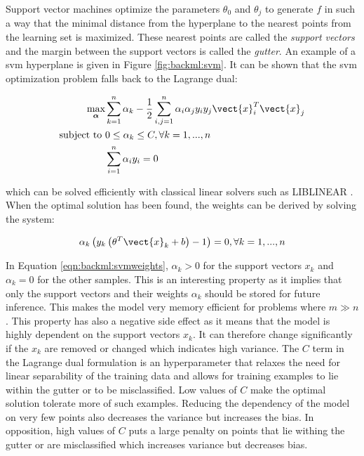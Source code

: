 Support vector machines optimize the parameters $\theta_0$ and $\theta_j$ to generate $f$ in such a way that the minimal distance from the hyperplane to the nearest points from the learning set is maximized. These nearest points are called the \textit{support vectors} and the margin between the support vectors is called the \textit{gutter}. An example of a \acrshort{svm} hyperplane is given in Figure \ref{fig:backml:svm}. It can be shown that the \acrshort{svm} optimization problem falls back to the Lagrange dual:
 
\begin{align}
\label{eqn:backml:svmoptimizationproblem}
\underset{\boldsymbol{\alpha}}{\text{max}}& \sum_{k=1}^n \alpha_k - \frac{1}{2} \sum_{i,j=1}^n \alpha_i\alpha_j y_i y_j \vect{x}_i^T \vect{x}_j \\
\text{subject to}~& 0 \leq \alpha_k \leq C, \forall k = 1, ..., n \\
& \sum_{i=1}^n \alpha_i y_i = 0
\end{align}

which can be solved efficiently with classical linear solvers such as LIBLINEAR \parencite{fan2008liblinear}. When the optimal solution has been found, the weights can be derived by solving the system: 

\begin{equation}
\label{eqn:backml:svmweights}
\alpha_k\left(y_k \left(\theta^T \vect{x}_k + b\right) - 1\right) = 0, \forall k = 1, ..., n
\end{equation}

In Equation \ref{eqn:backml:svmweights}, $\alpha_k > 0$ for the support vectors $x_k$ and $\alpha_k = 0$ for the other samples. This is an interesting property as it implies that only the support vectors and their weights $\alpha_k$ should be stored for future inference. This makes the model very memory efficient for problems where $m \gg n$. This property has also a negative side effect as it means that the model is highly dependent on the support vectors $x_k$. It can therefore change significantly if the $x_k$ are removed or changed which indicates high variance. The $C$ term in the Lagrange dual formulation is an hyperparameter that relaxes the need for linear separability of the training data and allows for training examples to lie within the gutter or to be misclassified. Low values of $C$ make the optimal solution tolerate more of such examples. Reducing the dependency of the model on very few points also decreases the variance but increases the bias. In opposition, high values of $C$ puts a large penalty on points that lie withing the gutter or are misclassified which increases variance but decreases bias. 

